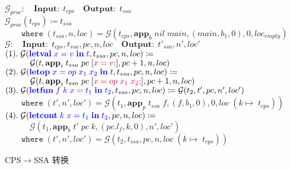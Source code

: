 \begin{figure}[!ht]
    \centering
    \begin{algorithm}[H]
        \caption{CPS$\rightarrow $SSA 转换}
        \SetAlgoLined
        $\mathcal{G}_{proc}:\quad \mathbf{Input:}\; t_{cps}\quad \mathbf{Output:}\; t_{ssa}$\\
        $\mathcal{G}_{proc}(t_{cps})\coloneqq t_{ssa}  $\\
        $\quad\quad \mathtt{where}\; (t_{ssa}, n, loc) = \mathbf{\mathcal{G}}(t_{cps}, \mathbf{app}_b\; nil\; main, (main, b_1, 0), 0, loc_{empty}) $\\
        \vspace*{0.5em}
        $ \mathbf{\mathcal{G}}:\quad \mathbf{Input:}\; t_{cps}, t_{ssa}, pc, n, loc\quad \mathbf{Output:}\; t'_{ssa}, n', loc' $ \\
        $ (1).\; \mathbf{\mathcal{G}}(\textcolor{blue}{\mathbf{letval}\; x=v\; \mathbf{in}\; t}, t_{ssa}, pc, n, loc) \coloneqq  $ \\
        $ \quad\quad\quad \mathbf{\mathcal{G}}(t, \mathbf{app}_i\; t_{ssa}\; pc\; [\textcolor{purple}{x=v;}], pc+1, n, loc) $ \\
        $ (2).\; \mathbf{\mathcal{G}}(\textcolor{blue}{\mathbf{letop}\; x=op\; x_1\; x_2\; \mathbf{in}\; t}, t_{ssa}, pc, n, loc) \coloneqq  $ \\
        $ \quad\quad\quad \mathbf{\mathcal{G}}(t, \mathbf{app}_i\; t_{ssa}\; pc\; [\textcolor{purple}{x=op\; x_1\; x_2;}], pc+1, n, loc) $ \\
        $ (3).\; \mathbf{\mathcal{G}}(\textcolor{blue}{\mathbf{letfun}\; f\; k\; x=t_1\; \mathbf{in}\; t_2}, t_{ssa}, pc, n, loc) \coloneqq \mathbf{\mathcal{G}}(t_2, t', pc, n', loc') $ \\
        $ \quad\quad \mathtt{where}\; (t', n', loc') = \mathbf{\mathcal{G}}(t_1, \mathbf{app}_p\; t_{ssa}\; f, (f, b_1, 0), 0, loc\; (k\mapsto\; t_{cps})) $ \\
        $ (4).\; \mathbf{\mathcal{G}}(\textcolor{blue}{\mathbf{letcont}\; k\; x=t_1\; \mathbf{in}\; t_2}, pc, n, loc) \coloneqq  $ \\
        $ \quad\quad\quad  \mathbf{\mathcal{G}}(t_1, \mathbf{app}_b\; t'\; pc\; k, (pc.l_f, k, 0), n', loc') $ \\
        $ \quad\quad \mathtt{where}\; (t', n', loc') = \mathbf{\mathcal{G}}(t_2, t_{ssa}, pc, n, loc\; (k\mapsto\; t_{cps})) $ \\

\end{algorithm}
\end{figure}
